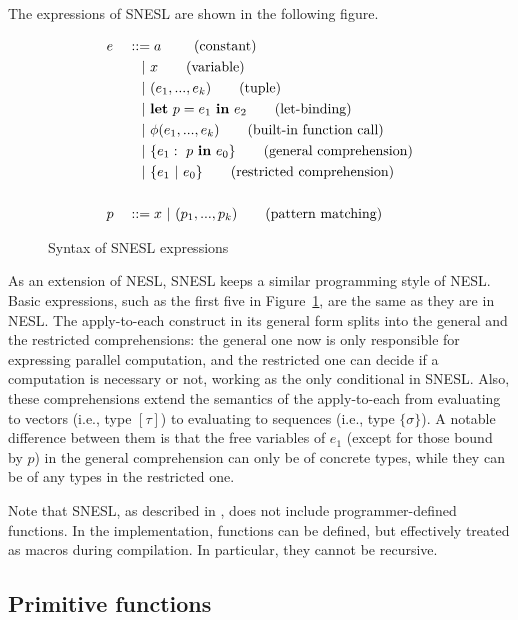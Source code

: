The expressions of SNESL are shown in the following figure.

\begin{figure}[H]\large 
\begin{alignat*}{2}
& e &&::=  a \     \tag{constant} \\
&   && \quad | \ x  \tag{variable} \\
&   && \quad | \ (e_1,...,e_k) \tag{tuple}\\
&   && \quad | \ \mathbf{let} \ p = e_1 \ \mathbf{in} \ e_2 \tag{let-binding}\\
&   && \quad | \ \phi{(e_1,...,e_k)}  \tag{built-in function call} \\
&   && \quad | \ \{e_1: \ p \ \mathbf{in} \ e_0 \} \tag{general comprehension} \\
&   && \quad | \ \{e_1 \ | \ e_0 \}\tag {restricted comprehension}\\
\\
& p &&::= x \ | \ (p_1,...,p_k) \tag{pattern matching}  
\end{alignat*}
\caption{Syntax of SNESL expressions \label{fig-snesl-exps}}
\end{figure}

As an extension of NESL, SNESL keeps a similar programming style of NESL. 
Basic expressions, such as the first five in Figure~\ref{fig-snesl-exps}, are the same as they are in NESL. 
The apply-to-each construct in its general form splits into the general and the restricted comprehensions:
the general one now is only responsible for expressing parallel computation,
and the restricted one can decide if a computation is necessary or not, working as the only conditional in SNESL.
Also, these comprehensions extend the semantics of the apply-to-each from evaluating to vectors (i.e., type $[\tau]$) to evaluating to sequences (i.e., type $\{\sigma\}$). 
A notable difference between them is that the free variables of $e_1$ (except for those bound by $p$) in the general comprehension can only be of concrete types, while they can be of any types in the restricted one.

Note that SNESL, as described in \cite{Fphd}, does not include programmer-defined functions. 
In the implementation, functions can be defined, but effectively treated as macros during compilation.
In particular, they cannot be recursive.

\subsection{Primitive functions}

